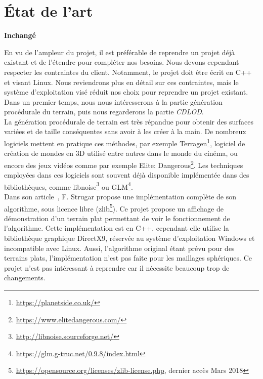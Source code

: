 \chapter*{État de l'art}
\setcounter{chapter}{0}

\textbf{Inchangé}

En vu de l'ampleur du projet, il est préférable de reprendre un projet
déjà existant et de l'étendre pour compléter nos besoins. Nous devons
cependant respecter les contraintes du client. Notamment, le projet doit
être écrit en C++ et visant Linux. Nous reviendrons plus en
détail sur ces contraintes, mais le système d'exploitation visé réduit
nos choix pour reprendre un projet existant. Dans un premier temps, nous
nous intéresserons à la partie génération procédurale du terrain, puis
nous regarderons la partie \emph{CDLOD}.\\

La génération procédurale de terrain est très répandue pour obtenir des
surfaces variées et de taille conséquentes sans avoir à les créer à la
main. De nombreux logiciels mettent en pratique ces méthodes, par
exemple Terragen\footnote{\url{https://planetside.co.uk/}}, logiciel de
création de mondes en 3D utilisé entre autres dans le monde du cinéma,
ou encore des jeux vidéos comme par exemple Elite:
Dangerous\footnote{\url{https://www.elitedangerous.com/}}. Les
techniques employées dans ces logiciels sont souvent déjà disponible
implémentée dans des bibliothèques, comme
libnoise\footnote{\url{http://libnoise.sourceforge.net/}} ou
GLM\footnote{\url{https://glm.g-truc.net/0.9.8/index.html}}.\\

Dans son article~\cite{CDLOD}, F. Strugar propose une implémentation
complète de son algorithme, sous licence libre
(zlib\footnote{\url{https://opensource.org/licenses/zlib-license.php}, dernier accès Mars 2018}).
Ce projet propose un affichage de démonstration d'un terrain plat
permettant de voir le fonctionnement de l'algorithme. Cette
implémentation est en C++, cependant elle utilise la bibliothèque
graphique DirectX9, réservée au système d'exploitation Windows et
incompatible avec Linux. Aussi, l'algorithme original étant prévu pour
des terrains plats, l'implémentation n'est pas faite pour les maillages
sphériques. Ce projet n'est pas intéressant à reprendre car il nécessite
beaucoup trop de changements.

